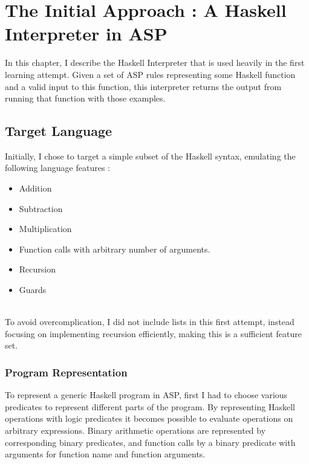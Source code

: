 \chapter{The Initial Approach : A Haskell Interpreter in ASP}

In this chapter, I describe the Haskell Interpreter that is used heavily in the first learning attempt. Given a set of ASP rules representing some Haskell function and a valid input to this function, this interpreter returns the output from running that function with those examples.

\section{Target Language}

Initially, I chose to target a simple subset of the Haskell syntax, emulating the following language features :

\begin{itemize}
\item Addition
\item Subtraction
\item Multiplication
\item Function calls with arbitrary number of arguments.
\item Recursion
\item Guards
\end{itemize}
\mbox{}\\
To avoid overcomplication, I did not include lists in this first attempt, instead focusing on implementing recursion efficiently, making this is a sufficient feature set. 

\subsection{Program Representation}
To represent a generic Haskell program in ASP, first I had to choose various predicates to represent different parts of the program. By representing Haskell operations with logic predicates it becomes possible to evaluate operations on arbitrary expressions. Binary arithmetic operations are represented by corresponding binary predicates, and function calls by a binary predicate with arguments for function name and function arguments.  \\ \\

